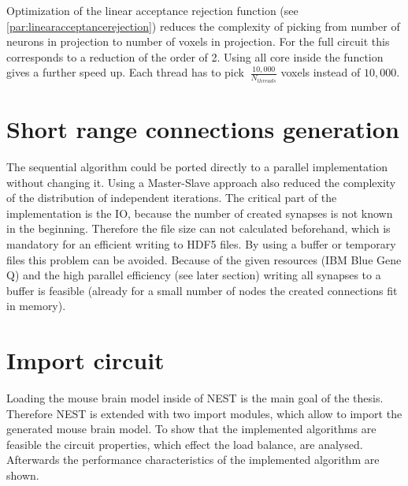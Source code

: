 Optimization of the linear acceptance rejection function (see \ref{par:linearacceptancerejection})
reduces the complexity of picking from number of neurons in projection to number of voxels in projection.
For the full circuit this corresponds to a reduction of the order of 2.
Using all core inside the function gives a further speed up.
Each thread has to pick $~\frac{10,000}{N_{threads}}$ voxels instead of
$10,000$.



\section{Short range connections generation}
The sequential algorithm could be ported directly to a parallel implementation without changing it.
Using a Master-Slave approach also reduced the complexity of the distribution of independent iterations.
The critical part of the implementation is the IO, because the number of created synapses is not known in the beginning.
Therefore the file size can not calculated beforehand, which is mandatory for an efficient writing to HDF5 files. 
By using a buffer or temporary files this problem can be avoided.
Because of the given resources (IBM Blue Gene Q) and the high parallel efficiency (see later section)
writing all synapses to a buffer is feasible (already for a small number of nodes the created connections fit in memory).

\section{Import circuit}
Loading the mouse brain model inside of NEST is the main goal of the thesis.
Therefore NEST is extended with two import modules, which allow to import the
generated mouse brain model. To show that the implemented algorithms are feasible 
the circuit properties, which effect the load balance, are analysed.
Afterwards the performance characteristics of the implemented algorithm are shown.

